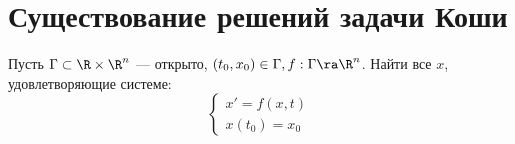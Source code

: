 
\section{Существование решений задачи Коши}
\begin{problem}[Коши]
    Пусть \(\Gamma \subset \R \times \R^n\) --- открыто, \((t_0, x_0) \in \Gamma, f: \Gamma \ra \R^n\).
    Найти все \(x\), удовлетворяющие системе:
    \begin{equation}
        \begin{cases}
            x' = f(x, t) \\
            x(t_0) = x_0
        \end{cases}
    \end{equation}
\end{problem}

